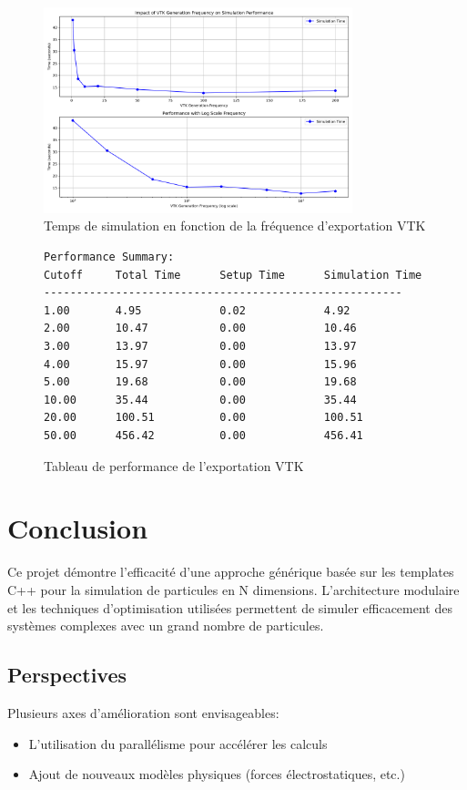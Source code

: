 \documentclass[12pt,a4paper]{article}
\begin{document}
\begin{figure}[H]
\centering
\includegraphics[width=0.8\textwidth]{perf/vtk_frequency_performance.png}
\caption{Temps de simulation en fonction de la fréquence d'exportation VTK}
\end{figure}

\begin{figure}[H]
\centering
\begin{minipage}{\textwidth}
\begin{verbatim}
Performance Summary:
Cutoff     Total Time      Setup Time      Simulation Time
-------------------------------------------------------
1.00       4.95            0.02            4.92           
2.00       10.47           0.00            10.46          
3.00       13.97           0.00            13.97          
4.00       15.97           0.00            15.96          
5.00       19.68           0.00            19.68          
10.00      35.44           0.00            35.44          
20.00      100.51          0.00            100.51         
50.00      456.42          0.00            456.41    
\end{verbatim}
\end{minipage}
\caption{Tableau de performance de l'exportation VTK}
\end{figure}

\section{Conclusion}

Ce projet démontre l'efficacité d'une approche générique basée sur les templates C++ pour la simulation de particules en N dimensions. L'architecture modulaire et les techniques d'optimisation utilisées permettent de simuler efficacement des systèmes complexes avec un grand nombre de particules.

\subsection{Perspectives}

Plusieurs axes d'amélioration sont envisageables:

\begin{itemize}
    \item L'utilisation du parallélisme pour accélérer les calculs
    \item Ajout de nouveaux modèles physiques (forces électrostatiques, etc.)
\end{itemize}
\end{document}
